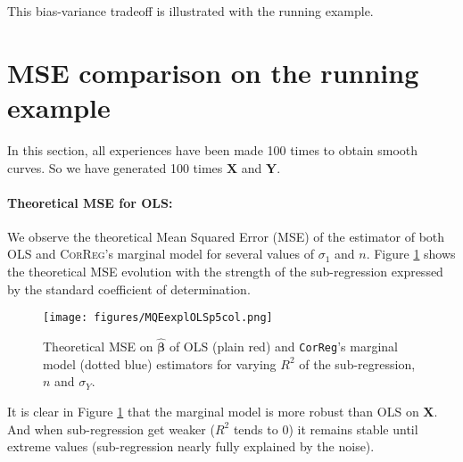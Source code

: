 \documentclass[12pt,a4paper]{report}
\begin{document}
	This bias-variance tradeoff is illustrated with the running example.
	\section{MSE comparison on the running example}\label{MSEvraiS}
In this section, all experiences have been made 100 times to obtain smooth curves. So we have generated 100 times $\boldsymbol{X}$ and $\boldsymbol{Y}$.\\	
	
\paragraph{Theoretical MSE for OLS:}
	 We observe the theoretical Mean Squared Error (MSE) of the estimator of both OLS and \textsc{CorReg}'s marginal  model for several values of $\sigma_1$ and $n$. Figure \ref{MQEexplOLSp5col} shows the theoretical MSE evolution with the strength of the sub-regression expressed by the standard coefficient of determination. 
\begin{figure}[h!]
	\texttt{[image: figures/MQEexplOLSp5col.png]}\label{MQEexplOLSp5col}
	\caption{Theoretical MSE on $\hat{\boldsymbol{\beta}}$ of OLS (plain red) and {\tt CorReg}'s marginal model (dotted blue) estimators for varying $R^2$ of the sub-regression, $n$ and $\sigma_Y$.}
\end{figure} 
It is clear in Figure \ref{MQEexplOLSp5col} that the marginal model is more robust than \textsc{OLS} on $\boldsymbol{X}$. And when sub-regression get weaker ($R^2$ tends to 0) it remains stable until extreme values (sub-regression nearly fully explained by the noise).\\
\end{document}
